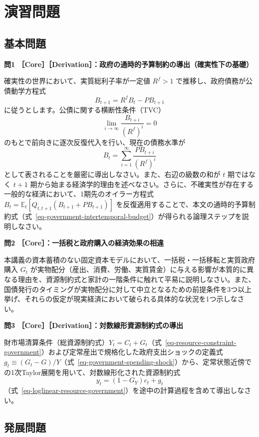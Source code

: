 \documentclass[
  japanese,
  lualatex,
  ja=standard,
  12pt,
  a4paper]{ltjsarticle}
\begin{document}
\clearpage

\section{演習問題}\label{ux6f14ux7fd2ux554fux984c}

\subsection{基本問題}\label{ux57faux672cux554fux984c}

\textbf{問1
［Core］［Derivation］：政府の通時的予算制約の導出（確実性下の基礎）}

確実性の世界において、実質総利子率が一定値 \(R^f > 1\)
で推移し、政府債務が公債動学方程式 \[
B_{t+1} = R^f B_t - PB_{t+1}
\] に従うとします。公債に関する横断性条件（TVC） \[
\lim_{i \to \infty} \frac{B_{t+i}}{(R^f)^i} = 0
\] のもとで前向きに逐次反復代入を行い、現在の債務水準が \[
B_t = \sum_{i=1}^\infty \frac{PB_{t+i}}{(R^f)^i}
\] として表されることを厳密に導出しなさい。また、右辺の級数の和が \(t\)
期ではなく \(t+1\)
期から始まる経済学的理由を述べなさい。さらに、不確実性が存在する一般的な経済において、1期先のオイラー方程式
\(B_t = \mathbb{E}_t [Q_{t,t+1}(B_{t+1} + PB_{t+1})]\)
を反復適用することで、本文の通時的予算制約式（式~\ref{eq-government-intertemporal-budget}）が得られる論理ステップを説明しなさい。

\textbf{問2 ［Core］：一括税と政府購入の経済効果の相違}

本講義の資本蓄積のない固定資本モデルにおいて、一括税・一括移転と実質政府購入
\(G_t\)
が実物配分（産出、消費、労働、実質賃金）に与える影響が本質的に異なる理由を、資源制約式と家計の一階条件に触れて平易に説明しなさい。また、国債発行のタイミングが実物配分に対して中立となるための前提条件を3つ以上挙げ、それらの仮定が現実経済において破られる具体的な状況を1つ示しなさい。

\textbf{問3 ［Core］［Derivation］：対数線形資源制約式の導出}

財市場清算条件（総資源制約式）\(Y_t = C_t + G_t\)（式~\ref{eq-resource-constraint-government}）および定常産出で規格化した政府支出ショックの定義式
\(g_t \equiv (G_t - G)/Y\)（式~\ref{eq-government-spending-shock}）から、定常状態近傍での1次Taylor展開を用いて、対数線形化された資源制約式
\[
y_t = (1-G_Y) c_t + g_t
\]
（式~\ref{eq-loglinear-resource-government}）を途中の計算過程を含めて導出しなさい。

\subsection{発展問題}\label{ux767aux5c55ux554fux984c}
\end{document}
